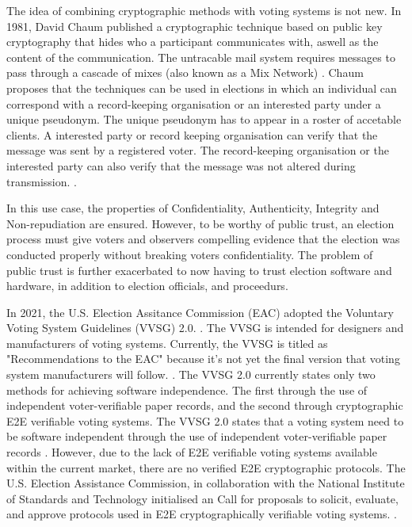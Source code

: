 The idea of combining cryptographic methods with voting systems is not new. In 1981, David Chaum published a cryptographic technique based on public key cryptography that hides who a participant communicates with, aswell as the content of the communication. The untracable mail system requires messages to pass through a cascade of mixes (also known as a Mix Network) \cite[86]{chaum}. Chaum proposes that the techniques can be used in elections in which an individual can correspond with a record-keeping organisation or an interested party under a unique pseudonym. The unique pseudonym has to appear in a roster of accetable clients. A interested party or record keeping organisation can verify that the message was sent by a registered voter. The record-keeping organisation or the interested party can also verify that the message was not altered during transmission. \cite[84]{chaum}. 

In this use case, the properties of Confidentiality, Authenticity, Integrity and Non-repudiation are ensured. However, to be worthy of public trust, an election process must give voters and observers compelling evidence that the election was conducted properly without breaking voters confidentiality. The problem of public trust is further exacerbated to now having to trust election software and hardware, in addition to election officials, and proceedurs.

In 2021, the U.S. Election Assitance Commission (EAC) adopted the Voluntary Voting System Guidelines (VVSG) 2.0. \cite{https://www.eac.gov news/2021/02/10 us-election-assistance-commission-adopts-new-voluntary-voting-system-guidelines-20}. The VVSG is intended for designers and manufacturers of voting systems. Currently, the VVSG is titled as "Recommendations to the EAC" because it's not yet the final version that voting system manufacturers will follow.
\cite{https://www.nist.gov/itl/voting/vvsg-introduction}. The VVSG 2.0 currently states only two methods for achieving software independence. The first through the use of independent voter-verifiable paper records, and the second through cryptographic E2E verifiable voting systems. The VVSG 2.0 states that a voting system need to be software independent through the use of independent voter-verifiable paper records
\cite[181]{https://www.eac.gov/sites/default/files/TestingCertification/Voluntary_Voting_System_Guidelines_Version_2_0.pdf}. However, due to the lack of E2E verifiable voting systems available within the current market, there are no verified E2E cryptographic protocols.\cite[199]{https://www.eac.gov/sites/default/files/TestingCertification/Voluntary_Voting_System_Guidelines_Version_2_0.pdf} The U.S. Election Assistance Commission, in collaboration with the National Institute of Standards and Technology initialised an Call for proposals to solicit, evaluate, and approve protocols used in E2E cryptographically verifiable voting systems. \cite{https://www.eac.gov/voting-equipment/end-end-e2e-protocol-evaluation-process}. 

